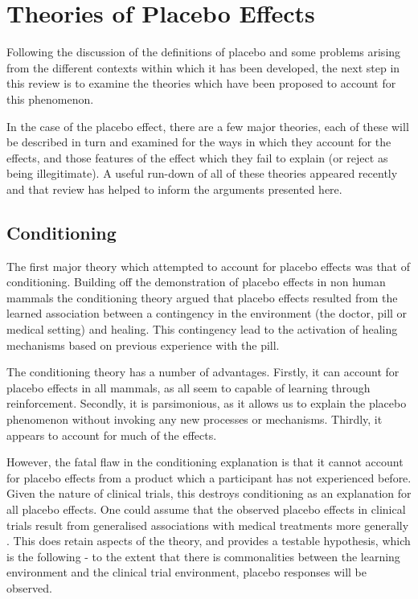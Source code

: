 
\section{Theories of Placebo Effects}
\label{sec:theor-plac-effects}

Following the discussion of the definitions of placebo and some problems arising from the different contexts within which it has been developed, the next step in this review is to examine the theories which have been proposed to account for this phenomenon. 

In the case of the placebo effect, there are a few major theories, each of these will be described in turn  and examined for the ways in which they account for the effects, and those features of the effect which they fail to explain (or reject as being illegitimate). A useful run-down of all of these theories appeared recently \cite{Stewart-Williams2004b} and that review has helped to inform the arguments presented here. 

\subsection{Conditioning}
\label{sec:conditioning}



The first major theory which attempted to account for placebo effects was that of conditioning. Building off the demonstration of placebo effects in non human mammals \cite{Herrnstein1962} the conditioning theory argued that placebo effects resulted from the learned association between a contingency in the environment (the doctor, pill or medical setting) and healing. This contingency lead to the activation of healing mechanisms based on previous experience with the pill. 

The conditioning theory has a number of advantages. Firstly, it can account for placebo effects in all mammals, as all seem to capable of learning through reinforcement. Secondly, it is parsimonious, as it allows us to explain the placebo phenomenon without invoking any new processes or mechanisms. Thirdly, it appears to account for much of the effects. 

However, the fatal flaw in the conditioning explanation is that it cannot account for placebo effects from a product which a participant  has not experienced before. Given the nature of clinical trials, this destroys  conditioning as an explanation for all placebo effects.  One could assume that the observed placebo effects in clinical trials result from generalised associations with medical treatments more generally \cite{pearce1987model}. This does retain aspects of the theory, and provides a testable hypothesis, which is the following - to the extent that there is commonalities between the learning environment and the clinical trial environment, placebo responses will be observed.  


